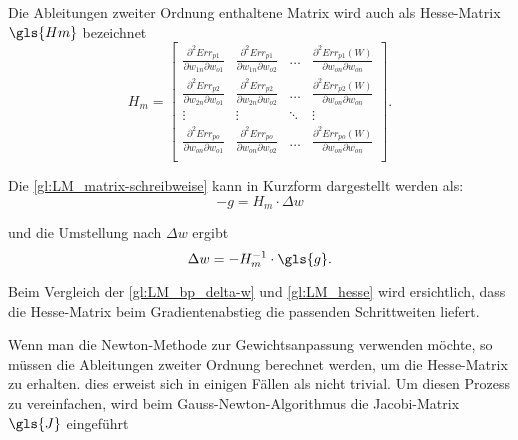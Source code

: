 Die Ableitungen zweiter Ordnung enthaltene Matrix wird auch als Hesse-Matrix $\gls{Hm}$ bezeichnet
\begin{equation}
H_m
 =
 \begin{bmatrix}
    \frac{\partial^2 Err_{p1}}{\partial w_{1n} \partial w_{o1}} & \frac{\partial^2 Err_{p1}}{\partial w_{1n} \partial w_{o2}}  & \dots  & \frac{\partial^2 Err_{p1}(W)}{\partial w_{on} \partial w_{on}} \\
    \frac{\partial^2 Err_{p2}}{\partial w_{2n} \partial w_{o1}} & \frac{\partial^2 Err_{p2}}{\partial w_{2n} \partial w_{o2}}  & \dots  & \frac{\partial^2 Err_{p2}(W)}{\partial w_{on} \partial w_{on}} \\
    \vdots & \vdots & \ddots & \vdots \\
    \frac{\partial^2 Err_{po}}{\partial w_{on} \partial w_{o1}} & \frac{\partial^2 Err_{po}}{\partial w_{on} \partial w_{o2}}  & \dots  & \frac{\partial^2 Err_{po}(W)}{\partial w_{on} \partial w_{on}} \\
 \label{gl:LM_hesse-mat}
 \end{bmatrix}
 .
\end{equation}

Die \autoref{gl:LM_matrix-schreibweise} kann in Kurzform dargestellt werden als:
\begin{equation}
-g=H_m \cdot \Delta w
\end{equation}

und die Umstellung nach $\Delta w$ ergibt
\begin{equation}
\Delta w =-H_m^{-1} \cdot \gls{g}.
\label{gl:LM_hesse}
\end{equation}

Beim Vergleich der \autoref{gl:LM_bp_delta-w} und \autoref{gl:LM_hesse} wird ersichtlich, dass die Hesse-Matrix beim Gradientenabstieg die passenden Schrittweiten liefert.

Wenn man die Newton-Methode zur Gewichtsanpassung verwenden möchte, so müssen die Ableitungen zweiter Ordnung berechnet werden, um die Hesse-Matrix zu erhalten. dies erweist sich in einigen Fällen als nicht trivial. Um diesen Prozess zu vereinfachen, wird beim Gauss-Newton-Algorithmus die Jacobi-Matrix $\gls{J}$ eingeführt

